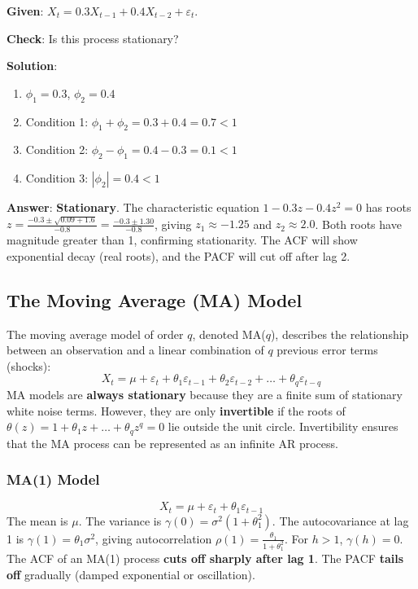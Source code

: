 \documentclass[11pt,a4paper]{article}
\begin{document}
\begin{tcolorbox}[colback=green!5!white,colframe=green!75!black,title=\textbf{Worked Example 3: AR(2) General Equation and Stationarity}]
\textbf{Given}: $X_t = 0.3 X_{t-1} + 0.4 X_{t-2} + \varepsilon_t$.

\textbf{Check}: Is this process stationary?

\textbf{Solution}:
\begin{enumerate}
    \item $\phi_1 = 0.3$, $\phi_2 = 0.4$
    \item Condition 1: $\phi_1 + \phi_2 = 0.3 + 0.4 = 0.7 < 1$ \checkmark
    \item Condition 2: $\phi_2 - \phi_1 = 0.4 - 0.3 = 0.1 < 1$ \checkmark
    \item Condition 3: $|\phi_2| = 0.4 < 1$ \checkmark
\end{enumerate}
\textbf{Answer}: \textbf{Stationary}. The characteristic equation $1 - 0.3z - 0.4z^2 = 0$ has roots $z = \frac{-0.3 \pm \sqrt{0.09 + 1.6}}{-0.8} = \frac{-0.3 \pm 1.30}{-0.8}$, giving $z_1 \approx -1.25$ and $z_2 \approx 2.0$. Both roots have magnitude greater than 1, confirming stationarity. The ACF will show exponential decay (real roots), and the PACF will cut off after lag 2.
\end{tcolorbox}

\subsection{The Moving Average (MA) Model}

The moving average model of order $q$, denoted MA($q$), describes the relationship between an observation and a linear combination of $q$ previous error terms (shocks):
\[
X_t = \mu + \varepsilon_t + \theta_1 \varepsilon_{t-1} + \theta_2 \varepsilon_{t-2} + \ldots + \theta_q \varepsilon_{t-q}
\]
MA models are \textbf{always stationary} because they are a finite sum of stationary white noise terms. However, they are only \textbf{invertible} if the roots of $\theta(z) = 1 + \theta_1 z + \ldots + \theta_q z^q = 0$ lie outside the unit circle. Invertibility ensures that the MA process can be represented as an infinite AR process.

\subsubsection{MA(1) Model}

\[
X_t = \mu + \varepsilon_t + \theta_1 \varepsilon_{t-1}
\]
The mean is $\mu$. The variance is $\gamma(0) = \sigma^2(1 + \theta_1^2)$. The autocovariance at lag 1 is $\gamma(1) = \theta_1 \sigma^2$, giving autocorrelation $\rho(1) = \frac{\theta_1}{1 + \theta_1^2}$. For $h > 1$, $\gamma(h) = 0$. The ACF of an MA(1) process \textbf{cuts off sharply after lag 1}. The PACF \textbf{tails off} gradually (damped exponential or oscillation).
\end{document}
